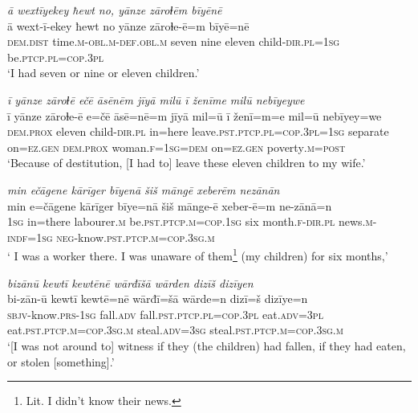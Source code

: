 \ea \label{ŽM.26}
\textit{ā wextīyekey ħewt no, yānze zāroɫēm bīyēnē} \\ 
\gll ā wext-ī-ekey ħewt no yānze zāroɫe-ē=m bīyē=nē \\ 
 \textsc{dem.dist} time\textsc{.m}\textsc{-obl}\textsc{.m}\textsc{-def}\textsc{.obl}\textsc{.m} seven nine eleven child\textsc{-dir}\textsc{.pl}\textsc{=\textsc{1sg}} be\textsc{.ptcp}\textsc{.pl}\textsc{=cop}\textsc{.3pl} \\ 
\glt `I had seven or nine or eleven children.'
\z 
 
\ea \label{ŽM.27}
\textit{ī yānze zāroɫē ečē āsēnēm jīyā milū ī ženīme milū nebīyeywe} \\ 
\gll ī yānze zāroɫe-ē e=čē āsē=nē=m jīyā mil=ū ī ženī=m=e mil=ū nebīyey=we \\ 
 \textsc{dem.prox} eleven child\textsc{-dir}\textsc{.pl} in=here leave\textsc{.pst}\textsc{.ptcp}\textsc{.pl}\textsc{=cop}\textsc{.3pl}\textsc{=\textsc{1sg}} separate on\textsc{=ez.gen} \textsc{dem.prox} woman\textsc{.f}\textsc{=\textsc{1sg}}\textsc{=dem} on\textsc{=ez.gen} poverty\textsc{.m}\textsc{=\textsc{post}} \\ 
\glt `Because of destitution, [I had to] leave these eleven children to my wife.'
\z 
 
\ea \label{ŽM.28}
\textit{min ečāgene kārīger bīyenā šiš māngē xeberēm nezānān} \\ 
\gll min e=čāgene kārīger bīye=nā šiš mānge-ē xeber-ē=m ne-zānā=n \\ 
 \textsc{1sg} in=there labourer\textsc{.m} be\textsc{.pst}\textsc{.ptcp}\textsc{.m}\textsc{=cop}\textsc{.\textsc{1sg}} six month\textsc{.f}\textsc{-dir}\textsc{.pl} news\textsc{.m}\textsc{-indf}\textsc{=\textsc{1sg}} \textsc{neg-}know\textsc{.pst}\textsc{.ptcp}\textsc{.m}\textsc{=cop}\textsc{.3sg}\textsc{.m} \\ 
\glt ` I was a worker there. I was unaware of them\footnote{Lit. I didn’t know their news.}  (my children) for six months,'
\z 
 
\ea \label{ŽM.29}
\textit{bizānū kewtī kewtēnē wārđīšā wārden dizīš dizīyen} \\ 
\gll bi-zān-ū kewtī kewtē=nē wārđī=šā wārde=n dizī=š dizīye=n \\ 
 \textsc{sbjv-}know\textsc{.prs}\textsc{-\textsc{1sg}} fall\textsc{.adv} fall\textsc{.pst}\textsc{.ptcp}\textsc{.pl}\textsc{=cop}\textsc{.3pl} eat\textsc{.adv}\textsc{=3pl} eat\textsc{.pst}\textsc{.ptcp}\textsc{.m}\textsc{=cop}\textsc{.3sg}\textsc{.m} steal\textsc{.adv}\textsc{=3sg} steal\textsc{.pst}\textsc{.ptcp}\textsc{.m}\textsc{=cop}\textsc{.3sg}\textsc{.m} \\ 
\glt `[I was not around to] witness if they (the children) had fallen, if they had eaten, or stolen [something].'
\z 
 
